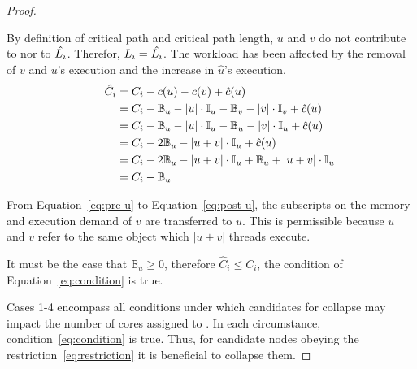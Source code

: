 \begin{theorem}
\begin{proof}
    \begin{case} By
      definition of critical path and critical path length, ${u}$ and
      ${v}$ do not contribute to  nor to
      ${\hat{\criticalpathlen{i}}}$. Therefor,
      ${\criticalpathlen{i} = \hat{\criticalpathlen{i}}}$. The
      workload has been affected by the removal of ${v}$ and ${u}$'s execution
      and the increase in ${\hat{u}}$'s execution. 
      \begin{align}
        \indent
        \hat{C}_i &= C_i - c(u) - c(v) + \hat{c}(u) \\
        &= C_i - \mathbb{B}_u - |u| \cdot \mathbb{I}_u
            - \mathbb{B}_v - |v| \cdot \mathbb{I}_v + \hat{c}(u)
            \label{eq:pre-u} \\
        &= C_i - \mathbb{B}_u - |u| \cdot \mathbb{I}_u
            - \mathbb{B}_u - |v| \cdot \mathbb{I}_u + \hat{c}(u)
            \label{eq:post-u} \\
        &= C_i -2\mathbb{B}_u - |u + v|\cdot \mathbb{I}_u +
            \hat{c}(u) \\
        &= C_i -2\mathbb{B}_u - |u + v|\cdot \mathbb{I}_u +
            \mathbb{B}_u + |u + v|\cdot \mathbb{I}_u \\
        &= C_i - \mathbb{B}_u
      \end{align}

      From Equation~\ref{eq:pre-u} to Equation~\ref{eq:post-u}, the
      subscripts on the memory and execution demand of ${v}$ are
      transferred to ${u}$. This is permissible because ${u}$ and
      ${v}$ refer to the same object which ${|u + v|}$ threads
      execute.

      It must be the case that ${\mathbb{B}_u \ge 0}$, therefore
      ${\hat{C}_i \le C_i}$, the condition of
      Equation~\ref{eq:condition} is true.
    \end{case}

    \begin{case}
    \end{case}

    Cases 1-4 encompass all conditions under which candidates for
    collapse may impact the number of cores assigned to . In
    each circumstance, condition~\ref{eq:condition} is true. Thus, for
    candidate nodes obeying the restriction~\ref{eq:restriction} it is
    beneficial to collapse them. 
  \end{proof}
\end{theorem}
